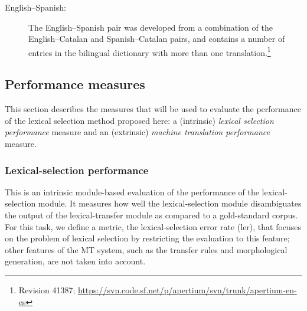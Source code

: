 \documentclass[11pt]{article}
\newcommand{\comment}[1]{\todo{#1}}
\begin{document}
\begin{description}
\item[English--Spanish:] The English--Spanish pair was developed from
  a combination of the English--Catalan and Spanish--Catalan pairs, and
  contains a number of entries in the bilingual dictionary with more
  than one translation.\footnote{Revision
  41387; \url{https://svn.code.sf.net/p/apertium/svn/trunk/apertium-en-es}}
\end{description}


\subsection{Performance measures}
\label{ss:measures}

This section describes the measures that will be used to evaluate the
performance of the lexical selection method proposed here: a
(intrinsic) \emph{lexical selection performance} measure and an
(extrinsic) \emph{machine translation performance} measure.

\label{sec:eval-metrics}
\subsubsection{Lexical-selection performance}
This is an intrinsic module-based evaluation of the performance of the
lexical-selection module.  It measures how well the lexical-selection
module disambiguates the output of the lexical-transfer module as
compared to a gold-standard corpus. For this task, we define a metric,
the lexical-selection error rate ({\sc ler}), that focuses on the
problem of lexical selection by restricting the evaluation to this
feature; other features of the MT system, such as the transfer rules
and morphological generation, are not taken into account.
\end{document}
